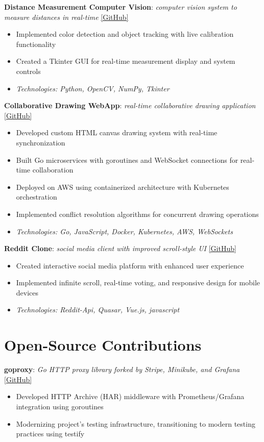 \documentclass[10pt,a4paper]{article}
\begin{document}
	
	\textbf{Distance Measurement Computer Vision}: \textit{computer vision system to measure distances in real-time} \href{https://github.com/CameronBadman/computer-vision}{[GitHub]}
	\begin{itemize}[label=\textbullet, itemsep=0.05cm]
		\item Implemented color detection and object tracking with live calibration functionality
		\item Created a Tkinter GUI for real-time measurement display and system controls
		\item \textit{Technologies: Python, OpenCV, NumPy, Tkinter}
	\end{itemize}
	
	\textbf{Collaborative Drawing WebApp}: \textit{real-time collaborative drawing application} \href{https://github.com/CameronBadman/Canvis-collab-webapp}{[GitHub]}
	\begin{itemize}[label=\textbullet, itemsep=0.05cm]
		\item Developed custom HTML canvas drawing system with real-time synchronization
		\item Built Go microservices with goroutines and WebSocket connections for real-time collaboration
		\item Deployed on AWS using containerized architecture with Kubernetes orchestration
		\item Implemented conflict resolution algorithms for concurrent drawing operations
		\item \textit{Technologies: Go, JavaScript, Docker, Kubernetes, AWS, WebSockets}
	\end{itemize}
	
	\textbf{Reddit Clone}: \textit{social media client with improved scroll-style UI} \href{https://github.com/CameronBadman/Reddit-Clone}{[GitHub]}
	\begin{itemize}[label=\textbullet, itemsep=0.05cm]
		\item Created interactive social media platform with enhanced user experience
		\item Implemented infinite scroll, real-time voting, and responsive design for mobile devices
		\item \textit{Technologies: Reddit-Api, Quasar, Vue.js, javascript}
	\end{itemize}
	
	\section{Open-Source Contributions}
	\textbf{goproxy}: \textit{Go HTTP proxy library forked by Stripe, Minikube, and Grafana} \href{https://github.com/elazarl/goproxy}{[GitHub]}
	\begin{itemize}[label=\textbullet, itemsep=0.02cm]
		\item Developed HTTP Archive (HAR) middleware with Prometheus/Grafana integration using goroutines
		\item Modernizing project's testing infrastructure, transitioning to modern testing practices using testify
	\end{itemize}
	
\end{document}
